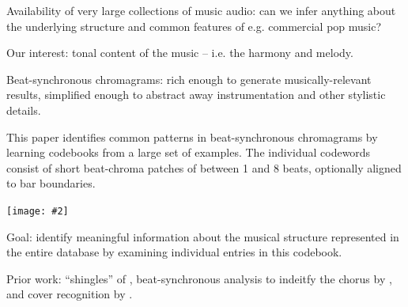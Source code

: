 \documentclass[landscape,a0b,final]{a0poster}
\newenvironment{poster}{
  \begin{center}
  \begin{minipage}[c]{0.98\textwidth}
}{
  \end{minipage} 
  \end{center}
}
\newenvironment{pcolumn}[1]{
  \begin{minipage}{#1\textwidth}
  \begin{center}
}{
  \end{center}
  \end{minipage}
}
\newcommand{\pbox}[4]{
\psshadowbox[#3]{
\begin{minipage}[t][#2][t]{#1}
#4
\end{minipage}
}}
\newcommand{\myfig}[3][0]{
\begin{center}
  \vspace{1.5cm}
  \texttt{[image: \#2]}
  \nobreak\medskip
\end{center}}
\begin{document}
\begin{poster}
\begin{center}
\begin{pcolumn}{0.98}
{}
\end{pcolumn}
\end{center}

\vspace*{0.5cm}


\begin{multicols}{3}


\begin{center}
  \pbox{0.8\columnwidth}{}{linewidth=2mm,framearc=0.1,linecolor=lightred,fillstyle=gradient,gradangle=0,gradbegin=white,gradend=whitepink,gradmidpoint=1.0,framesep=1em}{
    \begin{center}
      \large Introduction
    \end{center}}
\end{center}

\vspace{1.0cm}

\begin{list}{}{\leftmargin=2em =1em}
\item Availability of very large collections of music audio:
can we infer anything about the underlying structure and common
features of e.g. commercial pop music?
\item Our interest: tonal content of the music -- i.e. the
harmony and melody.
\item Beat-synchronous chromagrams: rich enough
to generate musically-relevant results, simplified enough to
abstract away instrumentation and other stylistic details.
\item This paper identifies common patterns in beat-synchronous
chromagrams by learning codebooks from a large set of examples.
The individual codewords consist of short beat-chroma patches of
between 1 and 8 beats, optionally aligned to bar boundaries.
\end{list}

\myfig[0]{code_axis.ps}{.2}

%
\begin{list}{}{\leftmargin=2em =1em}
\item Goal: identify meaningful information
about the musical structure represented in the entire database by
examining individual entries in this codebook.
\item Prior work: ``shingles'' of \cite{Casey2007}, 
beat-synchronous analysis to indeitfy the chorus by \cite{Bartsch2001},
and cover recognition by \cite{Ellis2007a}.
\end{list}



\end{multicols}
\end{poster}
\end{document}
